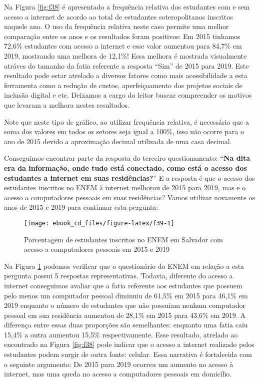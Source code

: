 \documentclass[
  oneside]{book}
\begin{document}
Na Figura \ref{fig:f38} é apresentado a frequência relativa dos estudantes com e sem acesso a internet de acordo ao total de estudantes soteropolitanos inscritos naquele ano. O uso da frequência relativa neste caso permite uma melhor comparação entre os anos e os resultados foram positivos: Em 2015 tinhamos 72,6\% estudantes com acesso a internet e esse valor aumentou para 84,7\% em 2019, mostrando uma melhora de 12,1\%! Essa melhora é mostrada visualmente atráves do tamanho da fatia referente a resposta ``Sim'' de 2015 para 2019. Este resultado pode estar atrelado a diversos fatores como mais acessibilidade a esta ferramenta como a redução de custos, aperfeiçoamento dos projetos sociais de inclusão digital e etc. Deixamos a cargo do leitor buscar compreender os motivos que levaram a melhora nestes resultados.

Note que neste tipo de gráfico, ao utilizar frequência relativa, é necessário que a soma dos valores em todos os setores seja igual a 100\%, isso não ocorre para o ano de 2015 devido a aproximação decimal utilizada de uma casa decimal.

Conseguimos encontrar parte da resposta do terceiro questionamento: ``\textbf{Na dita era da informação, onde tudo está conectado, como está o acesso dos estudantes a internet em suas residências?}'' E a resposta é que o acesso dos estudantes inscritos no ENEM à internet melhorou de 2015 para 2019, mas e o acesso a computadores pessoais em suas residências? Vamos utilizar novamente os anos de 2015 e 2019 para continuar esta pergunta:

\begin{figure}

{\centering \texttt{[image: ebook\_cd\_files/figure-latex/f39-1]} 

}

\caption{Porcentagem de estudantes inscritos no ENEM em Salvador com acesso a computadores pessoais em 2015 e 2019}\label{fig:f39}
\end{figure}

Na Figura \ref{fig:f39} podemos verificar que o questionário do ENEM em relação a esta pergunta possui 5 respostas representativas. Todavia, diferente do acesso a internet conseguimos avaliar que a fatia referente aos estudantes que possuem pelo menos um computador pessoal diminuiu de 61,5\% em 2015 para 46,1\% em 2019 enquanto o número de estudantes que não possuiam nenhum computador pessoal em sua residência aumentou de 28,1\% em 2015 para 43,6\% em 2019. A diferença entre essas duas proporções são semelhantes: enquanto uma fatia caiu 15,4\% a outra aumentou 15,5\% respectivamente. Esse resultado, atrelado ao encontrado na Figura \ref{fig:f38} pode indicar que o acesso a internet realizado pelos estudantes podem surgir de outra fonte: celular. Essa narrativa é fortalecida com o seguinte argumento: De 2015 para 2019 ocorreu um aumento no acesso à internet, mas uma queda no acesso a computadores pessoais em domicílio.
\end{document}
